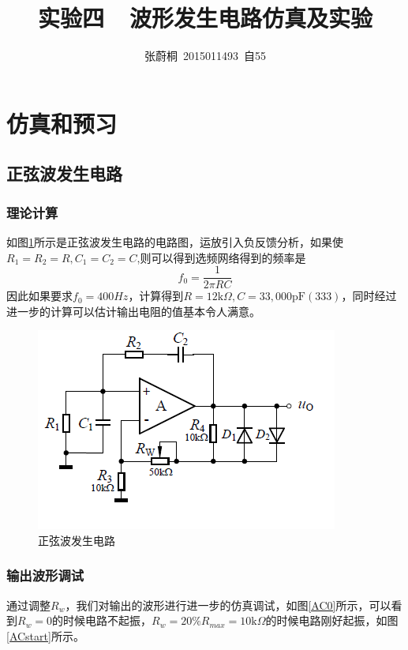 \documentclass[UTF8,a4paper]{paper}
\title{实验四\ \ 波形发生电路仿真及实验}
\author{张蔚桐\ 2015011493\ 自55}
\begin{document}
\maketitle
\section{仿真和预习}
\subsection{正弦波发生电路}
\subsubsection{理论计算}
\begin{multicols}{2}
如图\ref{ACCirc}所示是正弦波发生电路的电路图，运放引入负反馈分析，如果使$R_1=R_2=R,C_1=C_2=C$,则可以得到选频网络得到的频率是
$$f_0=\frac{1}{2\pi RC}$$
因此如果要求$f_0=400Hz$，计算得到$R=12\mathrm{k}\Omega,C=33,000\mathrm{pF}(333)$，同时经过进一步的计算可以估计输出电阻的值基本令人满意。
\begin {figure}[H]
\includegraphics [width=\columnwidth]{ac.png}
\caption{正弦波发生电路}
\label{ACCirc}
\end {figure}
\end{multicols}
\subsubsection{输出波形调试}
通过调整$R_w$，我们对输出的波形进行进一步的仿真调试，如图\ref{AC0}所示，可以看到$R_w=0$的时候电路不起振，$R_w=20\%R_{max}=10\mathrm{k}\Omega$的时候电路刚好起振，如图\ref{ACstart}所示。
\end{document}
